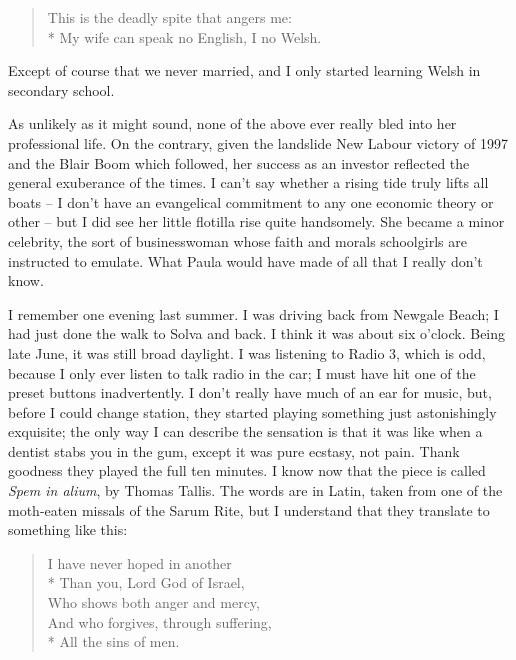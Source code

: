 \begin{quoting}
    \begin{verse}
        This is the deadly spite that angers me:\\*
        My wife can speak no English, I no Welsh.
    \end{verse}
\end{quoting}

Except of course that we never married, and I only started learning Welsh in secondary school.

As unlikely as it might sound, none of the above ever really bled into her professional life. On the contrary, given the landslide New Labour victory of 1997 and the Blair Boom which followed, her success as an investor reflected the general exuberance of the times. I can't say whether a rising tide truly lifts all boats -- I don't have an evangelical commitment to any one economic theory or other -- but I did see her little flotilla rise quite handsomely. She became a minor celebrity, the sort of businesswoman whose faith and morals schoolgirls are instructed to emulate. What Paula would have made of all that I really don't know.

I remember one evening last summer. I was driving back from Newgale Beach; I had just done the walk to Solva and back. I think it was about six o'clock. Being late June, it was still broad daylight. I was listening to Radio 3, which is odd, because I only ever listen to talk radio in the car; I must have hit one of the preset buttons inadvertently. I don't really have much of an ear for music, but, before I could change station, they started playing something just astonishingly exquisite; the only way I can describe the sensation is that it was like when a dentist stabs you in the gum, except it was pure ecstasy, not pain. Thank goodness they played the full ten minutes. I know now that the piece is called \textit{Spem in alium}, by Thomas Tallis. The words are in Latin, taken from one of the moth-eaten missals of the Sarum Rite, but I understand that they translate to something like this:

\begin{quoting}
    \begin{verse}
        I have never hoped in another\\*
        Than you, Lord God of Israel,\\
        Who shows both anger and mercy,\\
        And who forgives, through suffering,\\*
        All the sins of men.
    \end{verse}
\end{quoting}

